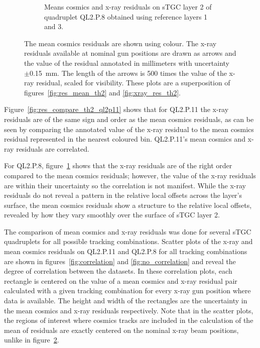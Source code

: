 \begin{figure}
\begin{subfigure}{\textwidth}
  \caption{Means cosmics and x-ray residuals on sTGC layer 2 of quadruplet QL2.P.8 obtained using reference layers 1 and 3.}
  \label{fig:res_compare_th2_ql2p8}
\end{subfigure}
\caption{The mean cosmics residuals are shown using colour. The x-ray residuals available at nominal gun positions are drawn as arrows and the value of the residual annotated in millimeters with uncertainty $\pm$\SI{0.15}{mm}. The length of the arrows is 500 times the value of the x-ray residual, scaled for visibility. These plots are a superposition of figures~\ref{fig:res_mean_th2} and \ref{fig:xray_res_th2}.}
\label{fig:res_compare_th2}
\end{figure}
\newpage
\restoregeometry

Figure~\ref{fig:res_compare_th2_ql2p11} shows that for QL2.P.11 the x-ray residuals are of the same sign and order as the mean cosmics residuals, as can be seen by comparing the annotated value of the x-ray residual to the mean cosmics residual represented in the nearest coloured bin. QL2.P.11's mean cosmics and x-ray residuals are correlated. 

For QL2.P.8, figure~\ref{fig:res_compare_th2_ql2p8} shows that the x-ray residuals are of the right order compared to the mean cosmics residuals; however, the value of the x-ray residuals are within their uncertainty so the correlation is not manifest. While the x-ray residuals do not reveal a pattern in the relative local offsets across the layer's surface, the mean cosmics residuals show a structure to the relative local offsets, revealed by how they vary smoothly over the surface of sTGC layer 2. 

The comparison of mean cosmics and x-ray residuals was done for several sTGC quadruplets for all possible tracking combinations. Scatter plots of the x-ray and mean cosmics residuals on QL2.P.11 and QL2.P.8 for all tracking combinations are shown in figures~\ref{fig:correlation} and \ref{fig:no_correlation} and reveal the degree of correlation between the datasets. In these correlation plots, each rectangle is centered on the value of a mean cosmics and x-ray residual pair calculated with a given tracking combination for every x-ray gun position where data is available. The height and width of the rectangles are the uncertainty in the mean cosmics and x-ray residuals respectively. Note that in the scatter plots, the regions of interest where cosmics tracks are included in the calculation of the mean of residuals are exactly centered on the nominal x-ray beam positions, unlike in figure~\ref{fig:res_compare_th2}.

